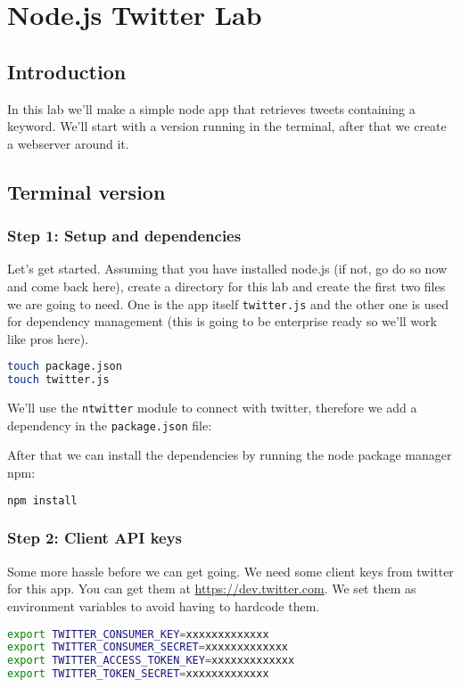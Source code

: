 \documentclass[a4paper]{report}
\begin{document}
\chapter*{\textcolor{seccol}{Node.js} Twitter Lab}

\section*{Introduction}
In this lab we'll make a simple node app that retrieves tweets containing a keyword. We'll start with a version running in the terminal, after that we create a webserver around it.

\section*{Terminal version}

\subsection*{Step 1: Setup and dependencies}
Let's get started. Assuming that you have installed node.js (if not, go do so now and come back here), create a directory for this lab and create the first two files we are going to need. One is the app itself \texttt{twitter.js} and the other one is used for dependency management (this is going to be enterprise ready so we'll work like pros here).

\begin{lstlisting}[language=bash]
touch package.json
touch twitter.js
\end{lstlisting}

\noindent We'll use the \texttt{ntwitter} module to connect with twitter, therefore we add a dependency in the \texttt{package.json} file:


After that we can install the dependencies by running the node package manager npm:
\begin{lstlisting}[language=bash]
npm install
\end{lstlisting}

\subsection*{Step 2: Client API keys}

Some more hassle before we can get going. We need some client keys from twitter for this app. You can get them at \url{https://dev.twitter.com}. We set them as environment variables to avoid having to hardcode them.
\begin{lstlisting}[language=bash]
export TWITTER_CONSUMER_KEY=xxxxxxxxxxxxx
export TWITTER_CONSUMER_SECRET=xxxxxxxxxxxxx
export TWITTER_ACCESS_TOKEN_KEY=xxxxxxxxxxxxx
export TWITTER_TOKEN_SECRET=xxxxxxxxxxxxx
\end{lstlisting}
\end{document}
